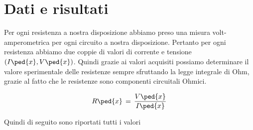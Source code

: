 \section*{Dati e risultati}

Per ogni resistenza a nostra disposizione abbiamo preso una misura volt-amperometrica per ogni circuito a nostra disposizione. Pertanto per ogni resistenza abbiamo due coppie di valori di corrente e tensione $(I\ped{x}, V\ped{x})$.
Quindi grazie ai valori acquisiti possiamo determinare il valore sperimentale delle resistenze sempre sfruttando la legge integrale di Ohm, grazie al fatto che le resistenze sono componenti circuitali Ohmici.

\begin{equation}
	R\ped{x} \,=\, \frac{V\ped{x}}{I\ped{x}}
\end{equation}

Quindi di seguito sono riportati tutti i valori 

